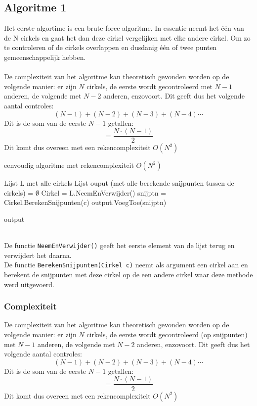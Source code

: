 \documentclass[11pt,a4paper]{article}
\begin{document}
\subsection{Algoritme 1}
Het eerste algortime is een brute-force algoritme. In essentie neemt het \'e\'en van de N cirkels en gaat het dan deze cirkel vergelijken met elke andere cirkel. Om zo te controleren of de cirkels overlappen en dusdanig \'e\'en of twee punten gemeenschappelijk hebben.
\\
\\
De complexiteit van het algoritme kan theoretisch gevonden worden op de volgende manier: er zijn $N$ cirkels, de eerste wordt gecontroleerd met $N-1$ anderen, de volgende met $N-2$ anderen, enzovoort. Dit geeft dus het volgende aantal controles:
$$(N-1) + (N-2) + (N-3) + (N - 4) \cdots $$
Dit is de som van de eerste $N-1$ getallen:
$$ = \frac{N\cdot (N-1)}{2} $$
Dit komt dus overeen met een rekencomplexiteit $O(N^2)$
\begin{algorithm}
\caption{eenvoudig algoritme met rekencomplexiteit $O(N^2)$}
\begin{algorithmic}
\State Lijst L met alle cirkels
\State Lijst ouput (met alle berekende snijpunten tussen de cirkels) = $\emptyset$
\State Cirkel = L.NeemEnVerwijder()
\State snijptn = Cirkel.BerekenSnijpunten(c)
\State output.VoegToe(snijptn)
\EndFor
\EndWhile

\Return output
\end{algorithmic}
\end{algorithm}
\\
De functie \verb|NeemEnVerwijder()| geeft het eerste element van de lijst terug en verwijdert het daarna.\\
De functie \verb|BerekenSnijpunten(Cirkel c)| neemt als argument een cirkel aan en berekent de snijpunten met deze cirkel op de een andere cirkel waar deze methode werd uitgevoerd.

\subsubsection{Complexiteit}
De complexiteit van het algoritme kan theoretisch gevonden worden op de volgende manier: er zijn $N$ cirkels, de eerste wordt gecontroleerd (op snijpunten) met $N-1$ anderen, de volgende met $N-2$ anderen, enzovoort. Dit geeft dus het volgende aantal controles:
$$(N-1) + (N-2) + (N-3) + (N - 4) \cdots $$
Dit is de som van de eerste $N-1$ getallen:
$$ = \frac{N\cdot (N-1)}{2} $$
Dit komt dus overeen met een rekencomplexiteit $O(N^2)$
\end{document}
